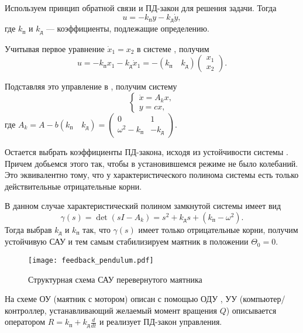 \documentclass[TAU.tex]{subfiles}
\begin{document}
Используем принцип обратной связи и ПД-закон для решения задачи. Тогда
$$
u = -k_\text{п} y - k_\text{д} \dot y,
$$
где $k_\text{п}$ и $k_\text{д}$ --- коэффициенты, подлежащие определению.

Учитывая первое уравнение $\dot x_1 = x_2$ в системе , получим
$$
u = - k_\text{п} x_1 - k_\text{д} \dot x_1 = - (k_\text{п}\quad k_\text{д}) \begin{pmatrix}x_1 \\ x_2\end{pmatrix}.
$$

Подставляя это управление в , получим систему
\begin{equation}\label{EQ2}
\begin{cases}
\dot x = A_kx,\\
y = c x,
\end{cases}
\end{equation}
где $A_k = A - b(k_\text{п}\quad k_\text{д})=\begin{pmatrix}0 & 1\\ \omega^2 - k_\text{п}& - k_\text{д}\end{pmatrix}$.

Остается выбрать коэффициенты ПД-закона, исходя из устойчивости системы . Причем добьемся этого так, чтобы в установившемся режиме не было колебаний. Это эквивалентно тому, что у характеристического полинома системы  есть только действительные отрицательные корни.

В данном случае характеристический полином замкнутой системы имеет вид
$$
\gamma(s) = \det (sI-A_k) = s^2+ k_\text{д}s+(k_\text{п}-\omega^2).
$$
Тогда выбрав $k_\text{д}$ и $k_\text{п}$ так, что $\gamma(s)$ имеет только отрицательные корни, получим устойчивую САУ и тем самым стабилизируем маятник в положении $\Theta_0 = 0$.

\begin{figure}[h]
\texttt{[image: feedback\_pendulum.pdf]}
\caption{Структурная схема САУ перевернутого маятника}
\centering
\end{figure}


На схеме ОУ (маятник с мотором) описан с помощью ОДУ , УУ (компьютер/контроллер, устанавливающий желаемый момент вращения $Q$) описывается оператором $R = k_\text{п}+k_\text{д}\frac{d}{dt}$ и реализует ПД-закон управления.
\end{document}
